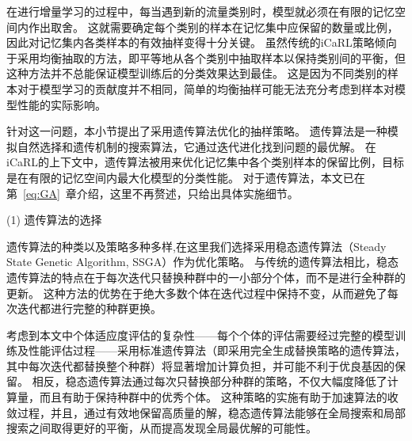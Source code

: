 


在进行增量学习的过程中，每当遇到新的流量类别时，模型就必须在有限的记忆空间内作出取舍。
这就需要确定每个类别的样本在记忆集中应保留的数量或比例，因此对记忆集内各类样本的有效抽样变得十分关键。
虽然传统的iCaRL策略倾向于采用均衡抽取的方法，即平等地从各个类别中抽取样本以保持类别间的平衡，但这种方法并不总能保证模型训练后的分类效果达到最佳。
这是因为不同类别的样本对于模型学习的贡献度并不相同，简单的均衡抽样可能无法充分考虑到样本对模型性能的实际影响。

针对这一问题，本小节提出了采用遗传算法优化的抽样策略。
遗传算法是一种模拟自然选择和遗传机制的搜索算法，它通过迭代进化找到问题的最优解。
在iCaRL的上下文中，遗传算法被用来优化记忆集中各个类别样本的保留比例，目标是在有限的记忆空间内最大化模型的分类性能。
对于遗传算法，本文已在第~\ref{eq:GA}~章介绍，这里不再赘述，只给出具体实施细节。\par

(1) 遗传算法的选择\par
遗传算法的种类以及策略多种多样,在这里我们选择采用稳态遗传算法（Steady State Genetic Algorithm, SSGA）作为优化策略。
与传统的遗传算法相比，稳态遗传算法的特点在于每次迭代只替换种群中的一小部分个体，而不是进行全种群的更新。
这种方法的优势在于绝大多数个体在迭代过程中保持不变，从而避免了每次迭代都进行完整的种群更换。\par

考虑到本文中个体适应度评估的复杂性——每个个体的评估需要经过完整的模型训练及性能评估过程——采用标准遗传算法（即采用完全生成替换策略的遗传算法，其中每次迭代都替换整个种群）将显著增加计算负担，并可能不利于优良基因的保留。
相反，稳态遗传算法通过每次只替换部分种群的策略，不仅大幅度降低了计算量，而且有助于保持种群中的优秀个体。
这种策略的实施有助于加速算法的收敛过程，并且，通过有效地保留高质量的解，稳态遗传算法能够在全局搜索和局部搜索之间取得更好的平衡，从而提高发现全局最优解的可能性。

